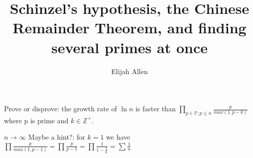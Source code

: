 \documentclass{amsart}
\theoremstyle{plain}
\numberwithin{equation}{section}
\begin{document}
\title[Primes in Patterns]{Schinzel's hypothesis, the Chinese Remainder Theorem, and finding several primes at once}
\author{Elijah Allen}






Prove or disprove:  the growth rate of $\ln n$ is faster than $\prod_{p\in \mathbb{P} : p \leq n}\frac{p}{max(1,p-k)}$ where p is prime and $k  \in \mathbb{Z}^+$.

$n \rightarrow \infty$
Maybe a hint?:   for $k=1$ we have $\prod\frac{p}{max(1,p-1)}=\prod\frac{p}{p-1}=\prod\frac{1}{1-\frac{1}{p}}=\sum{\frac{1}{n}}$
\end{document}
